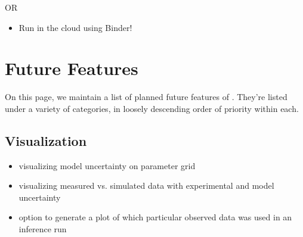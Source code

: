 \documentclass[letterpaper,10pt,english]{sphinxmanual}
\begin{document}
OR
\begin{itemize}
\item {}
Run in the cloud using Binder! 

\end{itemize}


\chapter{Future Features}
\label{\detokenize{futurefeatures:future-features}}\label{\detokenize{futurefeatures::doc}}
On this page, we maintain a list of planned future features of . They’re listed under a variety of categories, in loosely descending order of priority within each.


\section{Visualization}
\label{\detokenize{futurefeatures:visualization}}\begin{itemize}
\item {}
visualizing model uncertainty on parameter grid

\item {}
visualizing measured vs. simulated data with experimental and model uncertainty

\item {}
option to generate a plot of which particular observed data was used in an inference run

\end{itemize}
\end{document}
